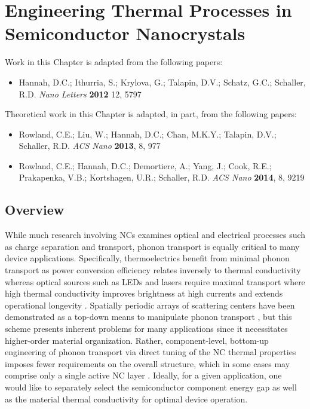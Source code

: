 \chapter{Engineering Thermal Processes in Semiconductor Nanocrystals}

Work in this Chapter is adapted from the following papers:
\begin{itemize}
\item Hannah, D.C.; Ithurria, S.; Krylova, G.; Talapin, D.V.; Schatz, G.C.; Schaller, R.D. \emph{Nano Letters} \textbf{2012} 12, 5797
\end{itemize}

Theoretical work in this Chapter is adapted, in part, from the following papers:

\begin{itemize}
\item Rowland, C.E.; Liu, W.; Hannah, D.C.; Chan, M.K.Y.; Talapin, D.V.; Schaller, R.D. \emph{ACS Nano} \textbf{2013}, 8, 977
\item Rowland, C.E.; Hannah, D.C.; Demortiere, A.; Yang, J.; Cook, R.E.; Prakapenka, V.B.; Kortshagen, U.R.; Schaller, R.D. \emph{ACS Nano} \textbf{2014}, 8, 9219
\end{itemize}

\section{Overview}

While much research involving NCs examines optical and electrical processes such as charge separation and transport, phonon transport is equally critical to many device applications. Specifically, thermoelectrics benefit from minimal phonon transport as power conversion efficiency relates inversely to thermal conductivity \cite{doi:10.1021/cm902195j} whereas optical sources such as LEDs and lasers \cite{doi:10.1021/nl9002969,Klimov13102000} require maximal transport where high thermal conductivity improves brightness at high currents and extends operational longevity \cite{Narendran2004449}.  Spatially periodic arrays of scattering centers have been demonstrated as a top-down means to manipulate phonon transport \cite{cheng2006observation,PhysRevLett.94.115501,doi:10.1021/nl102918q,PhysRevLett.100.194301}, but this scheme presents inherent problems for many applications since it necessitates higher-order material organization. Rather, component-level, bottom-up engineering of phonon transport via direct tuning of the NC thermal properties imposes fewer requirements on the overall structure, which in some cases may comprise only a single active NC layer \cite{doi:10.1021/nl9002969}. Ideally, for a given application, one would like to separately select the semiconductor component energy gap as well as the material thermal conductivity for optimal device operation. \par

